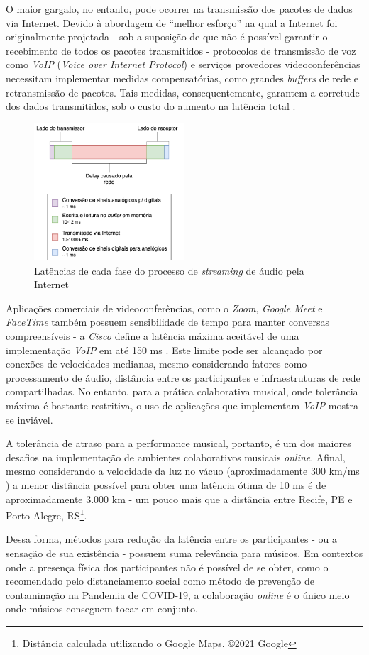 O maior gargalo, no entanto, pode ocorrer na transmissão dos pacotes de dados via Internet. Devido à abordagem de ``melhor esforço'' na qual a Internet foi originalmente projetada - sob a suposição de que não é possível garantir o recebimento de todos os pacotes transmitidos - protocolos de transmissão de voz como \textit{VoIP} (\textit{Voice over Internet Protocol}) e serviços provedores videoconferências necessitam implementar medidas compensatórias, como grandes \textit{buffers} de rede e retransmissão de pacotes. Tais medidas, consequentemente, garantem a corretude dos dados transmitidos, sob o custo do aumento na latência total \cite{carot_low_latency}.

\begin{figure}[htbp]
\centering
\includegraphics[width=0.5\textwidth]{images/streaming-latency.png}
\caption{Latências de cada fase do processo de \textit{streaming} de áudio pela Internet}
\label{fig:streaming_latencies}
\end{figure}

Aplicações comerciais de videoconferências, como o \textit{Zoom}, \textit{Google Meet} e \textit{FaceTime} também  possuem sensibilidade de tempo para manter conversas compreensíveis - a \textit{Cisco} define a latência máxima aceitável de uma implementação \textit{VoIP} em até 150 ms \cite{cisco}. Este limite pode ser alcançado por conexões de velocidades medianas, mesmo considerando fatores como processamento de áudio, distância entre os participantes e infraestruturas de rede compartilhadas. No entanto, para a prática colaborativa musical, onde tolerância máxima é bastante restritiva, o uso de aplicações que implementam \textit{VoIP} mostra-se inviável.

A tolerância de atraso para a performance musical, portanto, é um dos maiores desafios na implementação de ambientes colaborativos musicais \textit{online}. Afinal, mesmo considerando a velocidade da luz no vácuo (aproximadamente 300 km/ms \cite{speed_of_light}) a menor distância possível para obter uma latência ótima de 10 ms é de aproximadamente 3.000 km - um pouco mais que a distância entre Recife, PE e Porto Alegre, RS\footnote{Distância calculada utilizando o Google Maps. ©2021 Google}.

Dessa forma, métodos para redução da latência entre os participantes - ou a sensação de sua existência - possuem suma relevância para músicos. Em contextos onde a presença física dos participantes não é possível de se obter, como o recomendado pelo distanciamento social como método de prevenção de contaminação na Pandemia de COVID-19, a colaboração \textit{online} é o único meio onde músicos conseguem tocar em conjunto.
